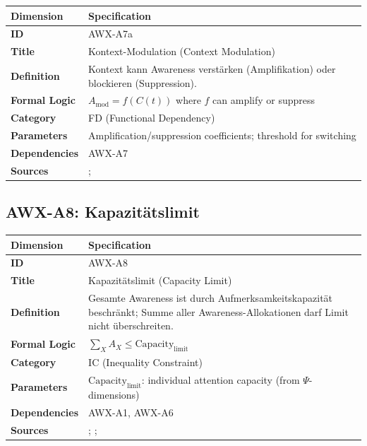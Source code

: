 \begin{table}[htbp]
\small
\begin{tabular}{p{3cm}p{11cm}}
\toprule
\textbf{Dimension} & \textbf{Specification} \\
\midrule
\textbf{ID} & AWX-A7a \\
\textbf{Title} & Kontext-Modulation (Context Modulation) \\
\textbf{Definition} & Kontext kann Awareness verstärken (Amplifikation) oder blockieren (Suppression). \\
\textbf{Formal Logic} & $A_{\text{mod}} = f(C(t))$ where $f$ can amplify or suppress \\
\textbf{Category} & FD (Functional Dependency) \\
\textbf{Parameters} & Amplification/suppression coefficients; threshold for switching \\
\textbf{Dependencies} & AWX-A7 \\
\textbf{Sources} & \citet{PAP-bordalo2012salience}; \citet{PAP-koszegi2006model} \\
\bottomrule
\end{tabular}
\end{table}


\subsection{AWX-A8: Kapazitätslimit}

\begin{table}[htbp]
\small
\begin{tabular}{p{3cm}p{11cm}}
\toprule
\textbf{Dimension} & \textbf{Specification} \\
\midrule
\textbf{ID} & AWX-A8 \\
\textbf{Title} & Kapazitätslimit (Capacity Limit) \\
\textbf{Definition} & Gesamte Awareness ist durch Aufmerksamkeitskapazität beschränkt; Summe aller Awareness-Allokationen darf Limit nicht überschreiten. \\
\textbf{Formal Logic} & $\sum_X A_X \leq \text{Capacity}_{\text{limit}}$ \\
\textbf{Category} & IC (Inequality Constraint) \\
\textbf{Parameters} & $\text{Capacity}_{\text{limit}}$: individual attention capacity (from $\Psi$-dimensions) \\
\textbf{Dependencies} & AWX-A1, AWX-A6 \\
\textbf{Sources} & \citet{PAP-simon1955behavioral}; \citet{PAP-kahneman2003maps}; \citet{sims2003implications} \\
\bottomrule
\end{tabular}
\end{table}

